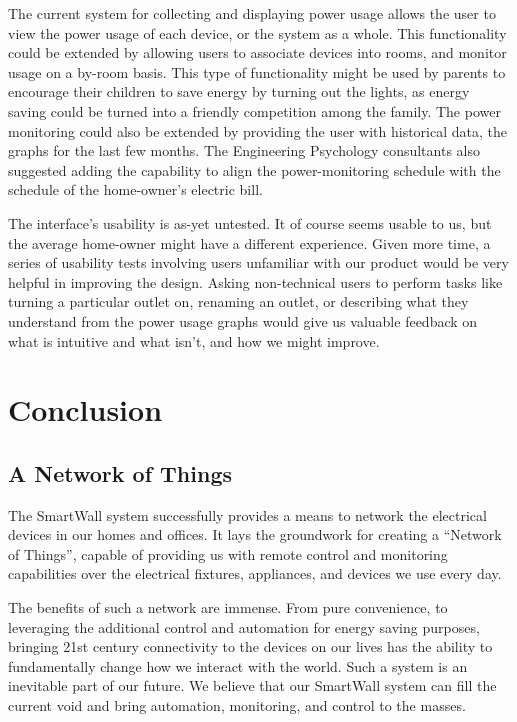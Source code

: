 \documentclass[11pt]{article}
\begin{document}
The current system for collecting and displaying power usage
allows the user to view the power usage of each device, or the
system as a whole. This functionality could be extended by
allowing users to associate devices into rooms, and monitor usage
on a by-room basis. This type of functionality might be used by
parents to encourage their children to save energy by turning out
the lights, as energy saving could be turned into a friendly
competition among the family. The power monitoring could also be
extended by providing the user with historical data, the graphs
for the last few months. The Engineering Psychology consultants
also suggested adding the capability to align the
power-monitoring schedule with the schedule of the home-owner’s
electric bill. 

The interface’s usability is as-yet untested. It of course seems
usable to us, but the average home-owner might have a different
experience. Given more time, a series of usability tests
involving users unfamiliar with our product would be very helpful
in improving the design. Asking non-technical users to perform
tasks like turning a particular outlet on, renaming an outlet, or
describing what they understand from the power usage graphs would
give us valuable feedback on what is intuitive and what isn't,
and how we might improve. 

\section{Conclusion}
\subsection{A Network of Things}
The SmartWall system successfully provides a means to network the
electrical devices in our homes and offices. It lays the groundwork for
creating a ``Network of Things'', capable of providing us with remote
control and monitoring capabilities over the electrical fixtures,
appliances, and devices we use every day.

The benefits of such a network are immense. From pure convenience, to
leveraging the additional control and automation for energy saving purposes,
bringing 21st century connectivity to the devices on our lives has the
ability to fundamentally change how we interact with the world. Such a
system is an inevitable part of our future. We believe that our SmartWall
system can fill the current void and bring automation, monitoring, and control
to the masses. 
\end{document}
